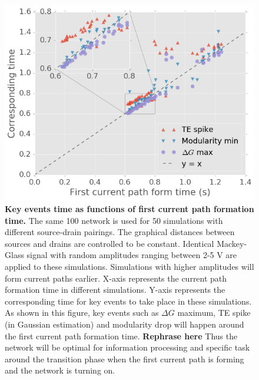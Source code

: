 \documentclass[%
 reprint,
 amsmath,amssymb,
 aps,
]{revtex4-2}
\begin{document}
\newpage
\begin{figure}[h]
	\centering
	\includegraphics[width=1\linewidth]{figure/time_align}
	\caption{\textbf{Key events time as functions of first current path formation time.} 
			The same 100 network is used for 50 simulations with different source-drain pairings. The graphical distances between sources and drains are controlled to be constant. Identical Mackey-Glass signal with random amplitudes ranging between 2-5 V are applied to these simulations. Simulations with higher amplitudes will form current paths earlier. 
			\newline 
			X-axis represents the current path formation time in different simulations. Y-axis represents the corresponding time for key events to take place in these simulations. As shown in this figure, key events such as $\Delta G$ maximum, TE spike (in Gaussian estimation) and modularity drop will happen around the first current path formation time. 
			\newline
			\textbf{Rephrase here} Thus the network will be optimal for information processing and specific task around the transition phase when the first current path is forming and the network is turning on. }
	\label{fig:time_align}
\end{figure}
\end{document}
